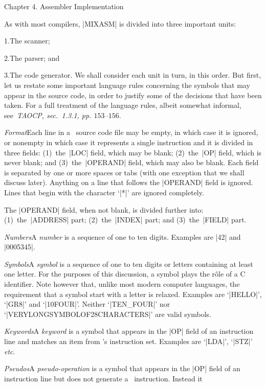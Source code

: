 \beginchapter Chapter 4. Assembler Implementation

As with most compilers, |MIXASM| is divided into three important units:
\smallskip
\item{1.}The scanner;
\item{2.}The parser; and
\item{3.}The code generator.
\smallskip\noindent
We shall consider each unit in turn, in this order. But first, let us restate some
important language rules concerning the symbols that may appear in the source code,
in order to justify some of the decisions that have been taken. For a full treatment
of the language rules, albeit somewhat informal, see~{\it TAOCP, sec.~1.3.1,
pp. $153$--$156$}.
\smallskip
\item{\sl Format}Each line in a \MIXAL\ source code file may be empty, in which
case it is ignored, or nonempty in which case it represents a single instruction
and it is divided in three fields:
(1)~the~|LOC| field, which may be blank; (2)~the~|OP| field, which is never blank;
and (3)~the~|OPERAND| field, which may also be blank. Each field is separated by 
one or more spaces or tabs (with one exception that we shall discuss later).
Anything on a line that follows the |OPERAND| field is ignored. Lines that begin
with the character `|*|' are ignored completely.
\item{}The |OPERAND| field, when not blank, is divided further into: (1)~the~|ADDRESS|
part; (2)~the~|INDEX| part; and (3)~the~|FIELD| part.
\item{\sl Numbers}A {\it number\/} is a sequence of one to ten digits. Examples are
|42| and |0005345|.
\item{\sl Symbols}A {\it symbol\/} is a sequence of one to ten digits or letters
containing at least one letter. For the purposes of this discussion, a symbol plays
the r\^ole of a C identifier. Note however that, unlike most modern computer languages,
the requirement that a symbol start with a letter is relaxed. Examples are `|HELLO|',
`|GR8|' and `|10FOUR|'. Neither `|TEN_FOUR|' nor `|VERYLONGSYMBOLOF28CHARACTERS|'
are valid symbols.
\item{\sl Keywords}A {\it keyword\/} is a symbol that appears in the |OP| field
of an instruction line and matches an item from \MIX's instruction set. Examples are 
`|LDA|', `|STZ|' {\it etc}.
\item{\sl Pseudos}A {\it pseudo-operation\/} is a symbol that appears in the |OP|
field of an instruction line but does not generate a \MIX\ instruction. Instead it
